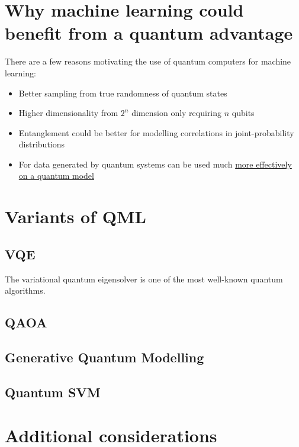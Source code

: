 \documentclass{book}
\begin{document}
\section{Why machine learning could benefit from a quantum advantage}

There are a few reasons motivating the use of quantum computers for machine learning:
\begin{itemize}
    \item Better sampling from true randomness of quantum states
    \item Higher dimensionality from $2^n$ dimension only requiring $n$ qubits
    \item Entanglement could be better for modelling correlations in joint-probability distributions
    \item For data generated by quantum systems can be used much \href{https://www.science.org/doi/10.1126/science.abn7293}{more effectively on a quantum model}
\end{itemize}

\section{Variants of QML} 

\subsection{VQE}

The variational quantum eigensolver is one of the most well-known quantum algorithms. 

\subsection{QAOA}

\subsection{Generative Quantum Modelling}

\subsection{Quantum SVM} 

\section{Additional considerations}
\end{document}

